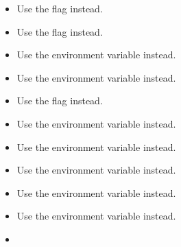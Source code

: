 \begin{itemize}

\item {}
  
  Use the  flag instead.


\item {}
  
  Use the  flag instead.



\item {}
  
  Use the  environment variable instead.


\item {}
  
  Use the  environment variable instead.


\item {}
  
  Use the  flag instead.



\item {}
  
  Use the  environment variable instead.


\item {}
  
  Use the  environment variable instead.


\item {}
  
  Use the  environment variable instead.


\item {}
  
  Use the  environment variable instead.


\item {}
  
  Use the  environment variable instead.


\item {}


\end{itemize}
